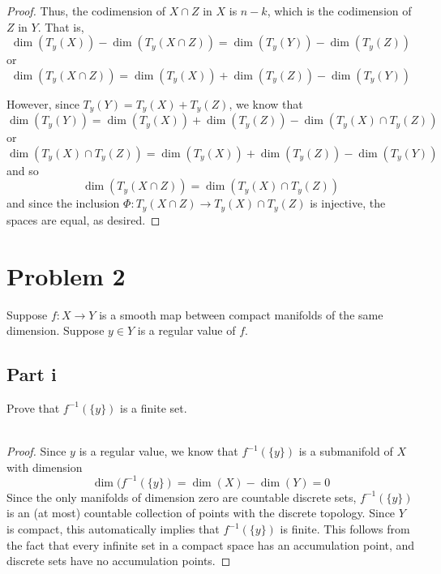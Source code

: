 \documentclass[fontsize=11pt]{scrartcl} %
\numberwithin{equation}{section} %
\numberwithin{figure}{section} %
\numberwithin{table}{section} %
\begin{document}
\begin{proof}
    Thus, the codimension of $X\cap Z$ in $X$ is $n-k$, which is the codimension
    of $Z$ in $Y$. That is,
    \[
        \dim(T_y(X)) - \dim(T_y(X\cap Z)) = \dim(T_y(Y))-\dim(T_y(Z))
    \]
    or
    \[
        \dim(T_y(X\cap Z)) = \dim(T_y(X)) + \dim(T_y(Z))-\dim(T_y(Y))
    \]

    However, since $T_y(Y) = T_y(X) + T_y(Z)$, we know that
    \[
    \dim(T_y(Y)) = \dim(T_y(X)) + \dim(T_y(Z))-\dim(T_y(X)\cap T_y(Z))
    \]
    or
    \[
        \dim(T_y(X)\cap T_y(Z)) = \dim(T_y(X)) + \dim (T_y(Z)) - \dim(T_y(Y))
    \]
    and so
    \[
        \dim(T_y(X\cap Z)) = \dim(T_y(X)\cap T_y(Z))
    \]
    and since the inclusion $\Phi:T_y(X\cap Z)\to T_y(X)\cap T_y(Z)$ is
    injective, the spaces are equal, as desired.
\end{proof}

\newpage

\section*{Problem 2}
Suppose $f:X\to Y$ is a smooth map between compact manifolds of the same
dimension. Suppose $y\in Y$ is a regular value of $f$.

\subsection*{Part i}
Prove that $f^{-1}(\{y\})$ is a finite set.
\\
\\
\begin{proof}
    Since $y$ is a regular value, we know that $f^{-1}(\{y\})$ is a submanifold
    of $X$ with dimension
    \[
        \dim(f^{-1}(\{y\}) = \dim(X)-\dim(Y) = 0
    \]
    Since the only manifolds of dimension zero are countable discrete sets,
    $f^{-1}(\{y\})$ is an (at most) countable collection of points with the
    discrete topology. Since $Y$ is compact, this automatically implies that
    $f^{-1}(\{y\})$ is finite. This follows from the fact that every infinite
    set in a compact space has an accumulation point, and discrete sets have no
    accumulation points.
\end{proof}
\end{document}

